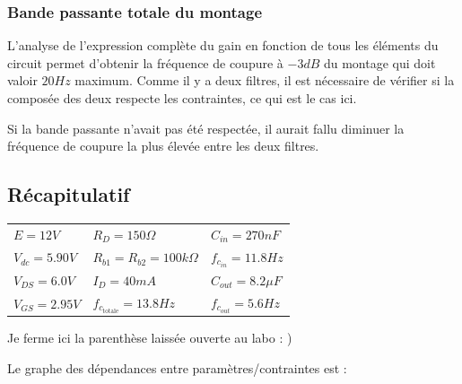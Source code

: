 \documentclass[11pt,a4paper]{article}
\theoremstyle{definition}%
\begin{document}
{\begin{center}
\end{center}

\subsubsection{Bande passante totale du montage}

L'analyse de l'expression complète du gain en fonction de tous les éléments du circuit permet d'obtenir la fréquence de coupure à $-3dB$ du montage qui doit valoir $20Hz$ maximum. Comme il y a deux filtres, il est nécessaire de vérifier si la composée des deux respecte les contraintes, ce qui est le cas ici.

Si la bande passante n'avait pas été respectée, il aurait fallu diminuer la fréquence de coupure la plus élevée entre les deux filtres.


\subsection{Récapitulatif}

\begin{center}
\begin{tabular}{lll}
$E=12V$ & $R_D=150\Omega$ & $C_{in}=270nF$ \\ 
$V_{dc}=5.90V$ & $R_{b1}=R_{b2}=100 k\Omega$ & $f_{c_{in}}=11.8Hz$ \\ 
$V_{DS}=6.0V$ & $I_D=40mA$ & $C_{out}=8.2\mu F$ \\ 
$V_{GS}=2.95V$ & $f_{c_{\mbox{totale}}}=13.8Hz$ & $f_{c_{out}}=5.6Hz$ \\ 
\end{tabular} 

\end{center}

{\color{white}Je ferme ici la parenthèse laissée ouverte au labo  : )}

Le graphe des dépendances entre paramètres/contraintes est :

}
\end{document}
